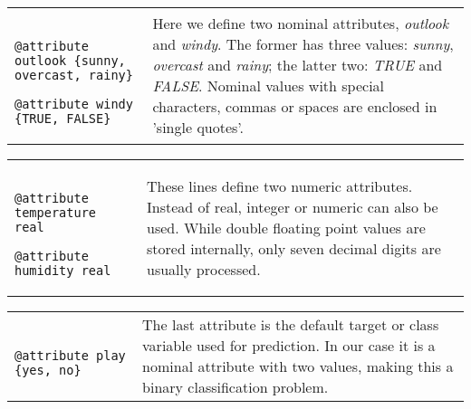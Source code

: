 \vspace{0.5cm}
\noindent
\begin{tabular}{l l}
	\begin{minipage}{7cm}
		{\scriptsize
		\begin{verbatim}
		@attribute outlook {sunny, overcast, rainy}
		@attribute windy {TRUE, FALSE}
		\end{verbatim}}
	\end{minipage}
	&
	\begin{minipage}{5cm}
	Here we define two nominal attributes, \textit{outlook} and \textit{windy}. The former has three values: \textit{sunny}, \textit{overcast} and \textit{rainy}; the latter two: \textit{TRUE} and \textit{FALSE}. Nominal values with special characters, commas or spaces are enclosed in 'single quotes'.
	\end{minipage}
	\\
\end{tabular}

\vspace{0.5cm}
\noindent
\begin{tabular}{l l}
	\begin{minipage}{7cm}
		{\scriptsize
		\begin{verbatim}
		@attribute temperature real
		@attribute humidity real
		\end{verbatim}}
	\end{minipage}
	&
	\begin{minipage}{5cm}
	These lines define two numeric attributes. Instead of real, integer or numeric can also be used. While double floating point values are stored internally, only seven decimal digits are usually processed.
	\end{minipage}
	\\
\end{tabular}

\vspace{0.5cm}
\noindent
\begin{tabular}{l l}
	\begin{minipage}{7cm}
		{\scriptsize
		\begin{verbatim}
		@attribute play {yes, no}
		\end{verbatim}}
	\end{minipage}
	&
	\begin{minipage}{5cm}
	The last attribute is the default target or class variable used for prediction. In our case it is a nominal attribute with two values, making this a binary classification problem.
	\end{minipage}
	\\
\end{tabular}

